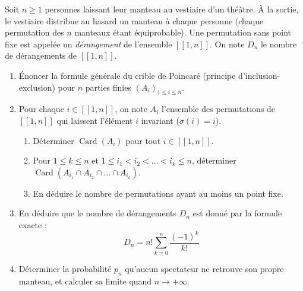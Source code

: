 \documentclass[11pt,a4paper]{article}
\begin{document}
Soit $n \ge 1$ personnes laissant leur manteau au vestiaire d'un théâtre. À la sortie, le vestiaire distribue au hasard un manteau à chaque personne (chaque permutation des $n$ manteaux étant équiprobable).
Une permutation sans point fixe est appelée un \emph{dérangement} de l'ensemble $[\![1, n]\!]$. On note $D_n$ le nombre de dérangements de $[\![1, n]\!]$.
\begin{enumerate}[label=\arabic*.]
    \item Énoncer la formule générale du crible de Poincaré (principe d'inclusion-exclusion) pour $n$ parties finies $(A_i)_{1 \le i \le n}$.
    \item Pour chaque $i \in [\![1, n]\!]$, on note $A_i$ l'ensemble des permutations de $[\![1, n]\!]$ qui laissent l'élément $i$ invariant ($\sigma(i) = i$).
    \begin{enumerate}
        \item Déterminer $\operatorname{Card}(A_i)$ pour tout $i \in [\![1, n]\!]$.
        \item Pour $1 \le k \le n$ et $1 \le i_1 < i_2 < \dots < i_k \le n$, déterminer $\operatorname{Card}(A_{i_1} \cap A_{i_2} \cap \dots \cap A_{i_k})$.
        \item En déduire le nombre de permutations ayant au moins un point fixe.
    \end{enumerate}
    \item En déduire que le nombre de dérangements $D_n$ est donné par la formule exacte :
    \[
    D_n = n! \sum_{k=0}^n \frac{(-1)^k}{k!}
    \]
    \item Déterminer la probabilité $p_n$ qu'aucun spectateur ne retrouve son propre manteau, et calculer sa limite quand $n \to +\infty$.
\end{enumerate}
\end{document}
